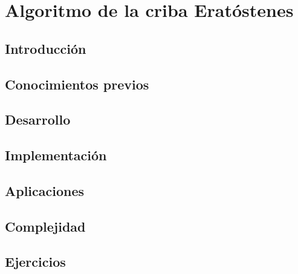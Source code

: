 \chapter{Algoritmo de la criba Eratóstenes}
\section{Introducción}

\section{Conocimientos previos}

\section{Desarrollo}

\section{Implementación}

\section{Aplicaciones}

\section{Complejidad}

\section{Ejercicios}
